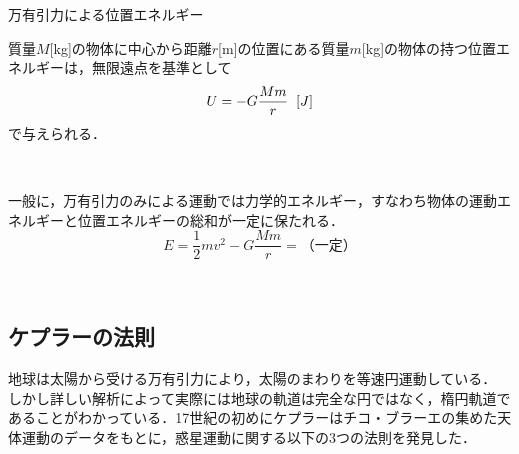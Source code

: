 \begin{matome}{万有引力による位置エネルギー}

\hspace{3mm}質量$M$[kg]の物体に中心から距離$r$[m]の位置にある質量$m$[kg]の物体の持つ位置エネルギーは，無限遠点を基準として
 \[ U=-G\dfrac{Mm}{r} \hspace{2mm}[J]\]
 で与えられる．
 \end{matome}

 \ 

一般に，万有引力のみによる運動では力学的エネルギー，すなわち物体の運動エネルギーと位置エネルギーの総和が一定に保たれる．
\[ E=\dfrac{1}{2}mv^2-G\dfrac{Mm}{r}=（一定）\]


 \ 
 
%

\subsection{ケプラーの法則}

地球は太陽から受ける万有引力により，太陽のまわりを等速円運動している．
しかし詳しい解析によって実際には地球の軌道は完全な円ではなく，楕円軌道であることがわかっている．17世紀の初めにケプラーはチコ・ブラーエの集めた天体運動のデータをもとに，惑星運動に関する以下の3つの法則を発見した．

